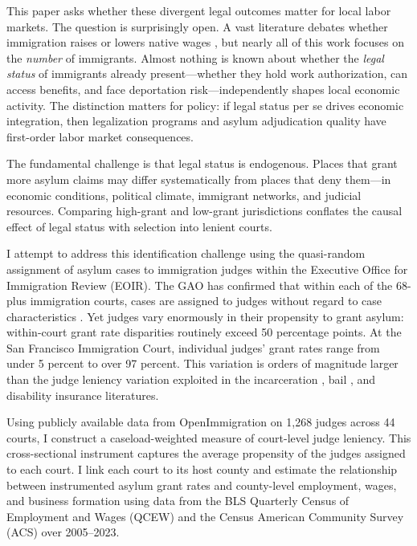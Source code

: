 \documentclass[12pt]{article}
\begin{document}
This paper asks whether these divergent legal outcomes matter for local labor markets. The question is surprisingly open. A vast literature debates whether immigration raises or lowers native wages \citep{borjas2003labor, card2001immigrant, ottaviano2012rethinking, dustmann2017labor}, but nearly all of this work focuses on the \textit{number} of immigrants. Almost nothing is known about whether the \textit{legal status} of immigrants already present---whether they hold work authorization, can access benefits, and face deportation risk---independently shapes local economic activity. The distinction matters for policy: if legal status per se drives economic integration, then legalization programs and asylum adjudication quality have first-order labor market consequences.

The fundamental challenge is that legal status is endogenous. Places that grant more asylum claims may differ systematically from places that deny them---in economic conditions, political climate, immigrant networks, and judicial resources. Comparing high-grant and low-grant jurisdictions conflates the causal effect of legal status with selection into lenient courts.

I attempt to address this identification challenge using the quasi-random assignment of asylum cases to immigration judges within the Executive Office for Immigration Review (EOIR). The GAO has confirmed that within each of the 68-plus immigration courts, cases are assigned to judges without regard to case characteristics \citep{gao2008asylum, gao2017asylum}. Yet judges vary enormously in their propensity to grant asylum: within-court grant rate disparities routinely exceed 50 percentage points. At the San Francisco Immigration Court, individual judges' grant rates range from under 5 percent to over 97 percent. This variation is orders of magnitude larger than the judge leniency variation exploited in the incarceration \citep{kling2006incarceration}, bail \citep{dobbie2018effects}, and disability insurance \citep{maestas2013does} literatures.

Using publicly available data from OpenImmigration on 1,268 judges across 44 courts, I construct a caseload-weighted measure of court-level judge leniency. This cross-sectional instrument captures the average propensity of the judges assigned to each court. I link each court to its host county and estimate the relationship between instrumented asylum grant rates and county-level employment, wages, and business formation using data from the BLS Quarterly Census of Employment and Wages (QCEW) and the Census American Community Survey (ACS) over 2005--2023.
\end{document}
